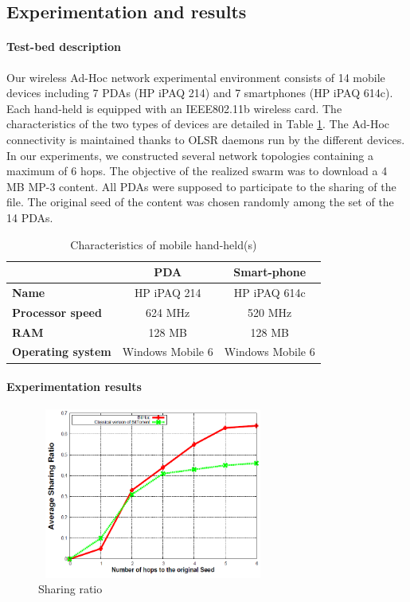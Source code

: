 \subsection{Experimentation and results}
\label{sectest}

\paragraph{Test-bed description}

Our wireless Ad-Hoc network experimental environment consists of 14 mobile devices including 7 PDAs (HP iPAQ 214) and 7 smartphones (HP iPAQ 614c). Each hand-held is equipped with an IEEE802.11b wireless card. The characteristics of the two types of devices are detailed in Table \ref{tabcarac}. The Ad-Hoc connectivity is maintained thanks to OLSR daemons run by the different devices. In our experiments, we constructed several network topologies containing a maximum of 6 hops. The objective of the realized swarm was to download a 4 MB MP-3 content. All PDAs were supposed to participate to the sharing of the file. The original seed of the content was chosen randomly among the set of the 14 PDAs.

\begin{table}[!h]
\center
\label{tabcarac}
\caption{Characteristics of mobile hand-held(s)}
\begin{tabular}{|l|c|c|}
  \hline
   & \textbf{PDA} & \textbf{Smart-phone} \\
  \hline
  \textbf{Name} & HP iPAQ 214 & HP iPAQ 614c\\
\hline
  \textbf{Processor speed} & 624 MHz & 520 MHz \\
  \hline
\textbf{RAM} & 128 MB & 128 MB \\
  \hline
\textbf{Operating system} & Windows Mobile 6 & Windows Mobile 6 \\
  \hline
\end{tabular}
\end{table}

\paragraph{Experimentation results}

\begin{figure}[!h]
  \begin{center}
    \includegraphics[width=3in,height=2.2in]{Chapitre2/sharingratio.png}
  \end{center}
  \caption{Sharing ratio}
  \label{figsharing}
\end{figure}

